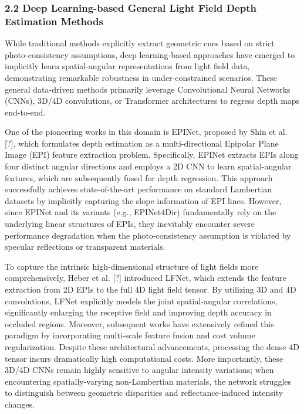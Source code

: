 \subsubsection{2.2 Deep Learning-based General Light Field Depth Estimation Methods}

While traditional methods explicitly extract geometric cues based on strict photo-consistency assumptions, deep learning-based approaches have emerged to implicitly learn spatial-angular representations from light field data, demonstrating remarkable robustness in under-constrained scenarios. These general data-driven methods primarily leverage Convolutional Neural Networks (CNNs), 3D/4D convolutions, or Transformer architectures to regress depth maps end-to-end.

One of the pioneering works in this domain is EPINet, proposed by Shin et al. [?], which formulates depth estimation as a multi-directional Epipolar Plane Image (EPI) feature extraction problem. Specifically, EPINet extracts EPIs along four distinct angular directions and employs a 2D CNN to learn spatial-angular features, which are subsequently fused for depth regression. This approach successfully achieves state-of-the-art performance on standard Lambertian datasets by implicitly capturing the slope information of EPI lines. However, since EPINet and its variants (e.g., EPINet4Dir) fundamentally rely on the underlying linear structures of EPIs, they inevitably encounter severe performance degradation when the photo-consistency assumption is violated by specular reflections or transparent materials.

To capture the intrinsic high-dimensional structure of light fields more comprehensively, Heber et al. [?] introduced LFNet, which extends the feature extraction from 2D EPIs to the full 4D light field tensor. By utilizing 3D and 4D convolutions, LFNet explicitly models the joint spatial-angular correlations, significantly enlarging the receptive field and improving depth accuracy in occluded regions. Moreover, subsequent works have extensively refined this paradigm by incorporating multi-scale feature fusion and cost volume regularization. Despite these architectural advancements, processing the dense 4D tensor incurs dramatically high computational costs. More importantly, these 3D/4D CNNs remain highly sensitive to angular intensity variations; when encountering spatially-varying non-Lambertian materials, the network struggles to distinguish between geometric disparities and reflectance-induced intensity changes.

